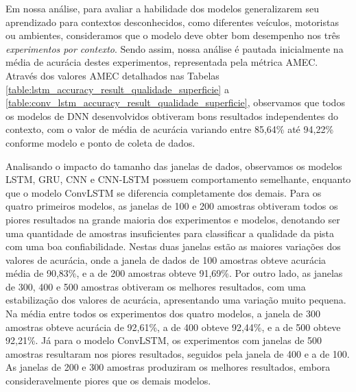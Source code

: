 Em nossa análise, para avaliar a habilidade dos modelos generalizarem seu aprendizado para contextos desconhecidos, como diferentes veículos, motoristas ou ambientes, consideramos que o modelo deve obter bom desempenho nos três \emph{experimentos por contexto}. Sendo assim, nossa análise é pautada inicialmente na média de acurácia destes experimentos, representada pela métrica AMEC. Através dos valores AMEC detalhados nas Tabelas \ref{table:lstm_accuracy_result_qualidade_superficie} a \ref{table:conv_lstm_accuracy_result_qualidade_superficie}, observamos que todos os modelos de DNN desenvolvidos obtiveram bons resultados independentes do contexto, com o valor de média de acurácia variando entre 85,64\% até 94,22\% conforme modelo e ponto de coleta de dados.

Analisando o impacto do tamanho das janelas de dados, observamos os modelos LSTM, GRU, CNN e CNN-LSTM possuem comportamento semelhante, enquanto que o modelo ConvLSTM se diferencia completamente dos demais. Para os quatro primeiros modelos, as janelas de 100 e 200 amostras obtiveram todos os piores resultados na grande maioria dos experimentos e modelos, denotando ser uma quantidade de amostras insuficientes para classificar a qualidade da pista com uma boa confiabilidade. Nestas duas janelas estão as maiores variações dos valores de acurácia, onde a janela de dados de 100 amostras obteve acurácia média de 90,83\%, e a de 200 amostras obteve 91,69\%. Por outro lado, as janelas de 300, 400 e 500 amostras obtiveram os melhores resultados, com uma estabilização dos valores de acurácia, apresentando uma variação muito pequena. Na média entre todos os experimentos dos quatro modelos, a janela de 300 amostras obteve acurácia de 92,61\%, a de 400 obteve 92,44\%, e a de 500 obteve 92,21\%. Já para o modelo ConvLSTM, os experimentos com janelas de 500 amostras resultaram nos piores resultados, seguidos pela janela de 400 e a de 100. As janelas de 200 e 300 amostras produziram os melhores resultados, embora consideravelmente piores que os demais modelos.

